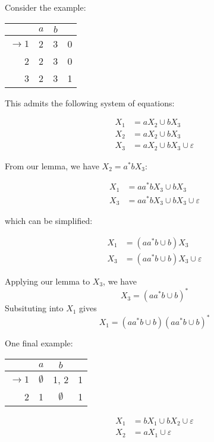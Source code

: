 Consider the example:

\begin{center}\begin{tabular}{r| c c r}
      & $a$ & $b$ & \\\hline
      $\to 1$ & 2 & 3 & 0\\
            2 & 2 & 3 & 0\\
            3 & 2 & 3 & 1
 \end{tabular}\end{center}

 This admits the following system of equations:

 \begin{align*}
      X_1 &= aX_2\cup bX_3\\
      X_2 &= aX_2\cup bX_3\\
      X_3 &= aX_2\cup bX_3\cup\varepsilon
\end{align*}

From our lemma, we have $X_2=a^*bX_3$:

\begin{align*}
      X_1 &= aa^*bX_3\cup bX_3\\
      X_3 &= aa^*bX_3\cup bX_3\cup\varepsilon
\end{align*}

which can be simplified:

\begin{align*}
      X_1 &= (aa^*b\cup b)X_3\\
      X_3 &= (aa^*b\cup b)X_3\cup\varepsilon
\end{align*}

Applying our lemma to $X_3$, we have \[X_3=(aa^*b\cup b)^*\] Subsituting into $X_1$ gives \[X_1=(aa^*b\cup b)(aa^*b\cup b)^*\] 

One final example:

\begin{center}\begin{tabular}{r| c c r}
      & $a$ & $b$ & \\\hline
      $\to 1$ & $\emptyset$ & 1, 2 & 1\\
            2 & 1 & $\emptyset$ & 1\\
 \end{tabular}\end{center}

\begin{align*}
      X_1 &= bX_1\cup bX_2\cup\varepsilon\\
      X_2 &= aX_1\cup\varepsilon
\end{align*}

